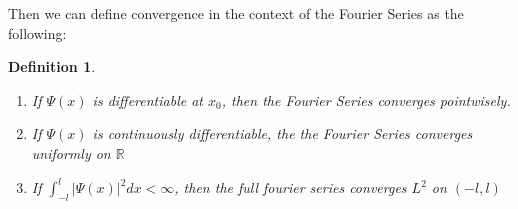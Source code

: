 \documentclass{article}
\newtheorem{definition}[theorem]{Definition}
\begin{document}
Then we can define convergence in the context of the Fourier Series as the following:

\begin{definition}
    \begin{enumerate}
        \item If $\Psi(x)$ is differentiable at $x_0$, then the Fourier Series converges pointwisely. 
        \item If $\Psi(x)$ is continuously differentiable, the the Fourier Series converges uniformly on $\mathbb{R}$
        \item If $\int_{-l}^{l}|\Psi(x)|^2dx < \infty$, then the full fourier series converges $L^2$ on $(-l, l)$
    \end{enumerate}

\end{definition}
\end{document}
